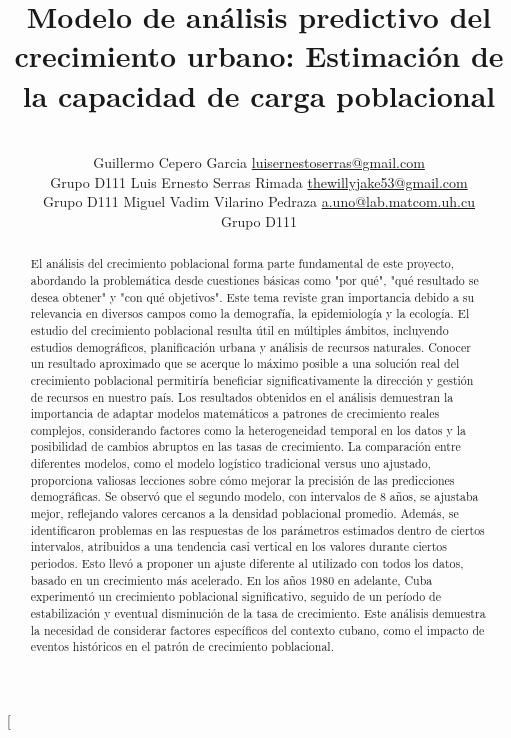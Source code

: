 \documentclass[a4paper,10pt,twocolumn]{article}
\title{Modelo de análisis predictivo del crecimiento urbano: Estimación de la capacidad de carga poblacional}
\author{\\
\name Guillermo Cepero Garcia \email \href{mailto:luisernestoserras@gmail.com}{luisernestoserras@gmail.com}
	\\ \addr Grupo D111 \AND
\name Luis Ernesto Serras Rimada \email \href{mailto:thewillyjake53@gmail.com}{thewillyjake53@gmail.com}
  \\ \addr Grupo D111 \AND
\name Miguel Vadim Vilarino Pedraza \email \href{mailto:a.uno@lab.matcom.uh.cu}{a.uno@lab.matcom.uh.cu}
	\\ \addr Grupo D111}
\begin{document}
\twocolumn[

\maketitle


\begin{abstract}

	El análisis del crecimiento poblacional forma parte fundamental de este proyecto, abordando la problemática desde cuestiones básicas como "por qué", "qué resultado se desea obtener" y "con qué objetivos". 
	Este tema reviste gran importancia debido a su relevancia en diversos campos como la demografía, la epidemiología y la ecología. El estudio del crecimiento poblacional resulta útil en múltiples ámbitos, incluyendo estudios demográficos, planificación urbana y análisis de recursos naturales. Conocer un resultado aproximado que se acerque lo máximo posible a una solución real del crecimiento poblacional permitiría beneficiar significativamente la dirección y gestión de recursos en nuestro país. Los resultados obtenidos en el análisis demuestran la importancia de adaptar modelos matemáticos a patrones de crecimiento reales complejos, considerando factores como la heterogeneidad temporal en los datos y la posibilidad de cambios abruptos en las tasas de crecimiento. La comparación entre diferentes modelos, como el modelo logístico tradicional versus uno ajustado, proporciona valiosas lecciones sobre cómo mejorar la precisión de las predicciones demográficas. Se observó que el segundo modelo, con intervalos de 8 años, se ajustaba mejor, reflejando valores cercanos a la densidad poblacional promedio. Además, se identificaron problemas en las respuestas de los parámetros estimados dentro de ciertos intervalos, atribuidos a una tendencia casi vertical en los valores durante ciertos periodos. Esto llevó a proponer un ajuste diferente al utilizado con todos los datos, basado en un crecimiento más acelerado. En los años 1980 en adelante, Cuba experimentó un crecimiento poblacional significativo, seguido de un período de estabilización y eventual disminución de la tasa de crecimiento. Este análisis demuestra la necesidad de considerar factores específicos del contexto cubano, como el impacto de eventos históricos en el patrón de crecimiento poblacional.

\end{abstract}
\end{document}
